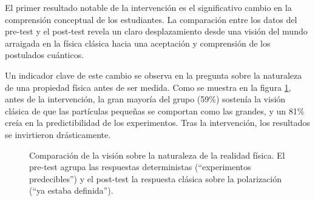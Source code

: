 \documentclass[10pt,a4paper]{article}
\begin{document}
El primer resultado notable de la intervención es el significativo cambio en la comprensión conceptual de los estudiantes. La comparación entre los datos del pre-test y el post-test revela un claro desplazamiento desde una visión del mundo arraigada en la física clásica hacia una aceptación y comprensión de los postulados cuánticos.

Un indicador clave de este cambio se observa en la pregunta sobre la naturaleza de una propiedad física antes de ser medida. Como se muestra en la figura \ref{fig:medicion_comparativo}, antes de la intervención, la gran mayoría del grupo (59\%) sostenía la visión clásica de que las partículas pequeñas se comportan como las grandes, y un 81\% creía en la predictibilidad de los experimentos. Tras la intervención, los resultados se invirtieron drásticamente.


\begin{figure}[h!]
    \centering
    \caption{Comparación de la visión sobre la naturaleza de la realidad física. El pre-test agrupa las respuestas deterministas (``experimentos predecibles'') y el post-test la respuesta clásica sobre la polarización (``ya estaba definida'').}
    \label{fig:medicion_comparativo}
\end{figure}



   
\end{document}
